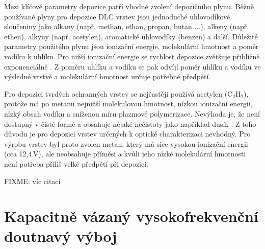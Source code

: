 Mezi klíčové parametry depozice patří vhodné zvolení depozičního plynu. Běžně používané plyny pro depozice DLC vrstev jsou jednoduché uhlovodíkové sloučeniny jako alkany (např. methan, ethan, propan, butan ...), alkeny (např. ethen), alkyny (např. acetylen), aromatické uhlovodíky (benzen) a další. Důležité parametry použitého plynu jsou ionizační energie, molekulární hmotnost a poměr vodíku k uhlíku. Pro nižší ionizační energie se rychlost depozice zvětšuje přibližně exponenciálně \cite{Koidl1991}. Z poměru uhlíku a vodíku se pak odvíjí poměr uhlíku a vodíku ve výsledné vrstvě a molekulární hmotnost určuje potřebné předpětí.

Pro depozici tvrdých ochranných vrstev se nejčastěji používá acetylen (C$_2$H$_2$), protože má po metanu nejnižší molekulovou hmotnost, nízkou ionizační energii, nízký obsah vodíku a sníženou míru plazmové polymerizace. Nevýhoda je, že není dostupný v čisté formě a obsahuje nějaké nečistoty jako například dusík \cite{Conway2000}. Z toho důvodu je pro depozici vrstev určených k optické charakterizaci nevhodný. Pro výrobu vrstev byl proto zvolen metan, který má sice vysokou ionizační energii (cca 12,4\,V), ale neobsahuje příměsi a kvůli jeho nízké molekulární hmotnosti není potřeba příliš velké předpětí při depozici.

FIXME: víc citací

\section{Kapacitně vázaný vysokofrekvenční doutnavý výboj}
\label{ccp}

